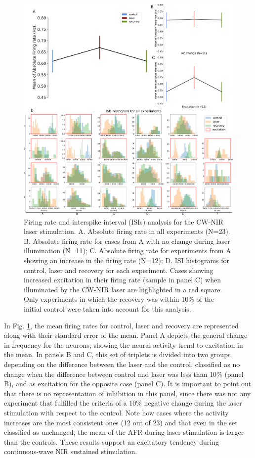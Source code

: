\begin{figure}[hb!]
     \centering
     \includegraphics[width=\textwidth]{img/laser/frequency.pdf}
     \caption{Firing rate and interspike interval (ISIs) analysis for the CW-NIR laser stimulation. A. Absolute firing rate in all experiments (N=23). B. Absolute firing rate for cases from A with no change during laser illumination (N=11); C. Absolute firing rate for experiments from A showing an increase in the firing rate (N=12); D. ISI histograms for control, laser and recovery for each experiment. Cases showing increased excitation in their firing rate (sample in panel C) when illuminated by the CW-NIR laser are highlighted in a red square. Only experiments in which the recovery was within 10\% of the initial control were taken into account for this analysis.}
     \label{fig:frequency FR}
\end{figure}

In Fig. \ref{fig:frequency FR}, the mean firing rates for control, laser and recovery are represented along with their standard error of the mean. Panel A depicts the general change in frequency for the neurons, showing the neural activity trend to excitation in the mean. In panels B and C, this set of triplets is divided into two groups depending on the difference between the laser and the control, classified as no change when the difference between control and laser was less than 10\% (panel B), and as excitation for the opposite case (panel C). It is important to point out that there is no representation of inhibition in this panel, since there was not any experiment that fulfilled the criteria of a 10\% negative change during the laser stimulation with respect to the control. Note how cases where the activity increases are the most consistent ones (12 out of 23) and that even in the set classified as unchanged, the mean of the AFR during laser stimulation is larger than the controls. These results support an excitatory tendency during continuous-wave NIR sustained stimulation.

